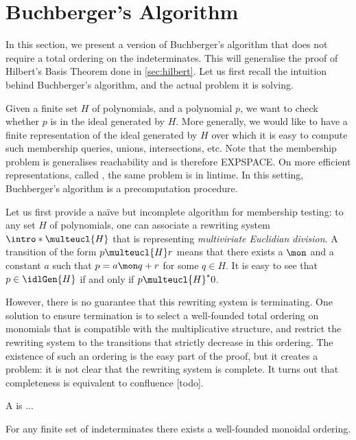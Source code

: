 \section{Buchberger's Algorithm}
\label{sec:buchberger}

In this section, we present a version of Buchberger's algorithm that does not
require a total ordering on the indeterminates. This will generalise the proof
of Hilbert's Basis Theorem done in \cref{sec:hilbert}. Let us first recall the
intuition behind Buchberger's algorithm, and the actual problem it is solving.

Given a finite set $H$ of polynomials, and a polynomial $p$, we want to check
whether $p$ is in the ideal generated by $H$. More generally, we would like to
have a finite representation of the ideal generated by $H$ over which it is
easy to compute such membership queries, unions, intersections, etc. Note that
the membership problem is generalises reachability and is therefore EXPSPACE.
On more efficient representations, called , the same
problem is in lintime. In this setting, Buchberger's algorithm is a
precomputation procedure.

Let us first provide a naïve but incomplete algorithm for membership testing:
to any set $H$ of polynomials, one can associate a rewriting system
$\intro*\multeucl{H}$ that is representing \emph{multiviriate Euclidian
division}. A transition of the form $p \multeucl{H} r$ means that there exists
a  $\mon$ and a constant $a$ such that $p = a \mon q + r$ for some
$q \in H$. It is easy to see that $p \in \idlGen{H}$ if and only if $p
\multeucl{H}^* 0$. 

However, there is no guarantee that this rewriting system is terminating. One
solution to ensure termination is to select a well-founded total ordering on
monomials that is compatible with the multiplicative structure, and restrict
the rewriting system to the transitions that strictly decrease in this
ordering. The existence of such an ordering is the easy part of the proof, but
it creates a problem: it is not clear that the rewriting system is complete. It
turns out that completeness is equivalent to confluence [todo].

\AP
A  is ...

\begin{lemma}
    For any finite set of indeterminates there exists
    a well-founded monoidal ordering.
\end{lemma}

